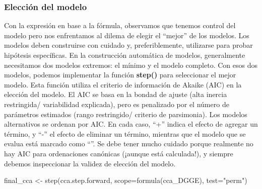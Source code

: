 \documentclass[
]{book}
\newenvironment{Shaded}{\begin{snugshade}}{\end{snugshade}}
\newcommand{\AttributeTok}[1]{\textcolor[rgb]{0.77,0.63,0.00}{#1}}
\newcommand{\FunctionTok}[1]{\textcolor[rgb]{0.00,0.00,0.00}{#1}}
\newcommand{\NormalTok}[1]{#1}
\newcommand{\OtherTok}[1]{\textcolor[rgb]{0.56,0.35,0.01}{#1}}
\newcommand{\StringTok}[1]{\textcolor[rgb]{0.31,0.60,0.02}{#1}}
\begin{document}
\hypertarget{elecciuxf3n-del-modelo}{%
\subsubsection{Elección del modelo}\label{elecciuxf3n-del-modelo}}

Con la expresión en base a la fórmula, observamos que tenemos control del modelo pero nos enfrentamos al dilema de elegir el ``mejor'' de los modelos.
Los modelos deben construirse con cuidado y, preferiblemente, utilizarse para probar
hipótesis específicas. En la construcción automática de modelos, generalmente necesitamos dos modelos extremos: el mínimo y el modelo completo. Con esos dos modelos, podemos implementar la función \textbf{step()} para seleccionar el mejor modelo. Esta función utiliza el criterio de información de Akaike (AIC) en la elección del modelo. El AIC se basa en la bondad de ajuste (alta inercia restringida/ variabilidad explicada), pero es penalizado por el número de parámetros estimados (rango restringido/ criterio de parsimonia). Los modelos alternativos se ordenan por AIC. En cada caso, ``+'' indica el efecto de agregar un término, y ``-'' el efecto de eliminar un término, mientras que el modelo que se evalua está marcado como ``''. Se debe tener mucho cuidado porque realmente no hay AIC para ordenaciones canónicas (¡aunque está calculada!), y siempre debemos inspeccionar la validez de elección del modelo.

\begin{Shaded}
\begin{Highlighting}[]
\NormalTok{final\_cca }\OtherTok{\textless{}{-}} \FunctionTok{step}\NormalTok{(cca.step.forward, }\AttributeTok{scope=}\FunctionTok{formula}\NormalTok{(cca\_DGGE), }\AttributeTok{test=}\StringTok{"perm"}\NormalTok{)}
\end{Highlighting}
\end{Shaded}
\end{document}
